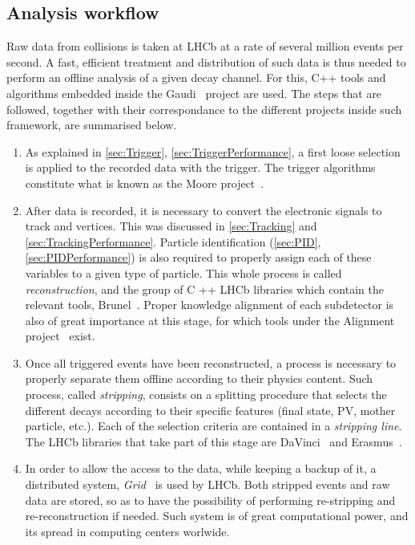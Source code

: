 
\subsection{Analysis workflow}
Raw data from collisions is taken at LHCb at a rate of several million events per second. A fast, efficient treatment and distribution of such data is thus needed to perform an offline analysis of a given decay channel. For this, C++ tools and algorithms embedded inside the Gaudi~\cite{Mato:691746} project are used. The steps that are followed, together with their correspondance to the different projects inside such framework, are summarised below. 

\begin{enumerate}
\item As explained in \ref{sec:Trigger}, \ref{sec:TriggerPerformance}, a first loose selection is applied to the recorded data with the trigger. The trigger algorithms constitute what is known as the Moore project~\cite{Moore}. 
\item After data is recorded, it is necessary to convert the electronic signals to track and vertices. This was discussed in \ref{sec:Tracking} and \ref{sec:TrackingPerformance}. Particle identification (\ref{sec:PID}, \ref{sec:PIDPerformance}) is also required to properly assign each of these variables to a given type of particle. This whole process is called \textit{reconstruction}, and the group of C ++ LHCb libraries which contain the relevant tools, Brunel~\cite{Brunel}. Proper knowledge alignment of each subdetector is also of great importance at this stage, for which tools under the Alignment project~\cite{Alignment} exist.  %
\item Once all triggered events have been reconstructed, a process is necessary to properly separate them offline according to their physics content. Such process, called \textit{stripping}, consists on a splitting procedure that selects the different decays according to their specific features (final state, PV, mother particle, etc.). Each of the selection criteria are contained in a \textit{stripping line}. The LHCb libraries that take part of this stage are DaVinci~\cite{DaVinci} and Erasmus~\cite{Erasmus}.
\item In order to allow the access to the data, while keeping a backup of it, a distributed system, \textit{Grid}~\cite{Eck:840543} is used by LHCb. Both stripped events and raw data are stored, so as to have the possibility of performing re-stripping and re-reconstruction if needed. Such system is of great computational power, and its spread in computing centers worlwide. 

\end{enumerate}
